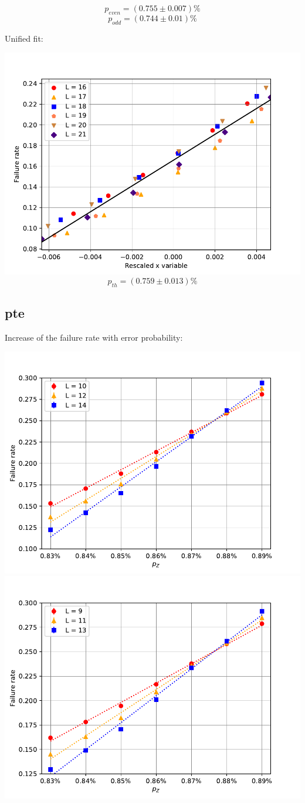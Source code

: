 \documentclass[pra]{revtex4-1}
\begin{document}
\[  p_{even} = (0.755 \pm 0.007)\% \]
\[  p_{odd} = (0.744 \pm 0.01)\% \]
\clearpage 

Unified fit: \begin{center} 

\includegraphics[width=.9\textwidth]{../graphs-paper2/pcu-dephasing-rescaled.pdf}
\[  p_{th} = (0.759 \pm 0.013)\% \] \end{center}
\clearpage 

\subsection*{pte}
\noindent Increase of the failure rate with error probability: 
  
\includegraphics[width=.49\textwidth]{../graphs-paper2/pte-dephasing-even.pdf}
\includegraphics[width=.49\textwidth]{../graphs-paper2/pte-dephasing-odd.pdf}
\end{document}
